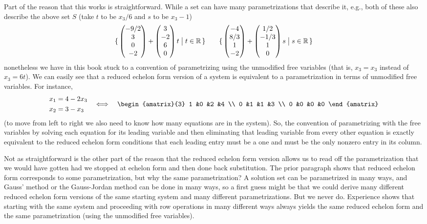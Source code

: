 Part of the reason that this works is straightforward.
While a set can have many parametrizations that describe it, e.g.,
both of these also describe the above set $S$
(take $t$ to be $x_3/6$ and $s$ to be $x_3-1$) 
\begin{equation*}
  \mbox{$\{\,\begin{pmatrix} -9/2 \\ 3 \\ 0 \\ -2 \end{pmatrix}
                         +\begin{pmatrix} 3 \\ -2 \\ 6 \\ 0 \end{pmatrix}t
                        \bigm| t\in\mathbb{R}\,\}$}
  \qquad
  \mbox{$\{\,\begin{pmatrix} -4 \\ 8/3 \\ 1 \\ -2 \end{pmatrix}
                         +\begin{pmatrix} 1/2 \\ -1/3 \\ 1 \\ 0 \end{pmatrix}s
                        \bigm| s\in\mathbb{R}\,\}$}
\end{equation*} 
nonetheless we have in this book stuck to a convention of
parametrizing using the unmodified free variables (that is, 
$x_3=x_3$ instead of $x_3=6t$).
We can easily see that
a reduced echelon form version of a system is equivalent to
a parametrization in terms of unmodified free variables.
For instance,
\begin{equation*}
  \begin{aligned}
    x_1 &=4-2x_3 \\
    x_2 &=3-x_3
  \end{aligned}
  \quad\Longleftrightarrow\quad
  \begin{amatrix}{3}
    1  &0  &2  &4  \\
    0  &1  &1  &3  \\
    0  &0  &0  &0
  \end{amatrix}
\end{equation*}
(to move from left to right we also need to know how many equations are
in the system).
So, the convention of parametrizing with the free variables by solving
each equation for its leading variable and then eliminating that leading
variable from every other equation is exactly equivalent to the reduced
echelon form conditions that each leading entry must be a one and must be the
only nonzero entry in its column.

Not as straightforward is the other 
part of the reason that the reduced echelon form version allows us to
read off the parametrization that we would have gotten had we stopped at
echelon form and then done back substitution.
The prior paragraph shows that reduced echelon form corresponds to some
parametrization, but why the same parametrization?
A solution set can be parametrized in many ways, and Gauss' method
or the Gauss-Jordan method can be done in many ways, so a first guess
might be that we could derive many different reduced echelon form
versions of the same starting system and many different parametrizations.
But we never do.
Experience shows that starting with the same system and  proceeding with row
operations in many different ways always yields the same reduced echelon form
and the same parametrization (using the unmodified free variables).

